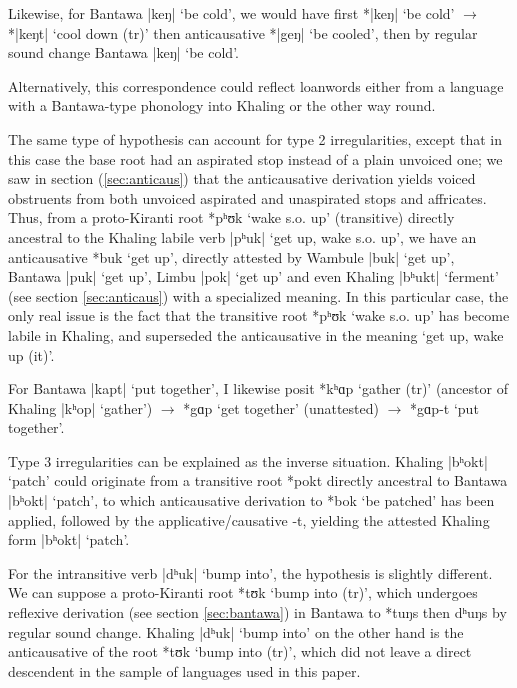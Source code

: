 \documentclass[oneside,a4paper,11pt]{article}
\newcommand{\ipa}[1]{{\phon\mbox{#1}}} %
\newcommand{\dhatu}[2]{|\ipa{#1}| `#2'}
\begin{document}
Likewise, for Bantawa \dhatu{keŋ}{be cold}, we would have first *\dhatu{keŋ}{be cold} $\rightarrow$ *\dhatu{keŋt}{cool down (tr)} then anticausative *\dhatu{geŋ}{be cooled}, then by regular sound change Bantawa \dhatu{keŋ}{be cold}.
 
 Alternatively, this correspondence could reflect loanwords either from a language with a Bantawa-type phonology into Khaling or the other way round.
 
The same type of hypothesis can account for type 2 irregularities, except that in this case the base root  had an aspirated stop instead of a plain unvoiced one; we saw in section  (\ref{sec:anticaus}) that the anticausative derivation yields voiced obstruents from both unvoiced aspirated and unaspirated stops and affricates. Thus, from a proto-Kiranti root \ipa{*pʰʊk} `wake s.o. up' (transitive) directly ancestral to the Khaling labile verb \dhatu{pʰuk}{get up, wake s.o. up}, we have an anticausative \ipa{*buk} `get up', directly attested by Wambule \dhatu{buk}{get up}, Bantawa \dhatu{puk}{get up}, Limbu \dhatu{pok}{get up} and even Khaling \dhatu{bʰukt}{ferment} (see section \ref{sec:anticaus}) with a specialized meaning. In this particular case, the only real issue is the fact that the transitive root \ipa{*pʰʊk} `wake s.o. up' has become labile in Khaling, and superseded the anticausative in the meaning `get up, wake up (it)'.

For Bantawa  \dhatu{kapt}{put together}, I likewise posit *\ipa{kʰɑp} `gather (tr)' (ancestor of Khaling \dhatu{kʰop}{gather}) $\rightarrow$  *\ipa{gɑp} `get together' (unattested) $\rightarrow$  *\ipa{gɑp-t} `put together'.
 
Type 3  irregularities can be explained as the inverse situation. Khaling \dhatu{bʰokt}{patch} could originate from a transitive root *\ipa{pokt} directly ancestral to Bantawa \dhatu{bʰokt}{patch}, to which anticausative derivation to *\ipa{bok} `be patched' has been applied, followed by the applicative/causative \ipa{-t}, yielding the attested Khaling form \dhatu{bʰokt}{patch}. 

For the intransitive verb \dhatu{dʰuk}{bump into}, the hypothesis is slightly different. We can suppose a proto-Kiranti root *\ipa{tʊk} `bump into (tr)', which undergoes reflexive derivation (see section \ref{sec:bantawa}) in Bantawa to *\ipa{tuŋs} then \ipa{dʰuŋs} by regular sound change. Khaling \dhatu{dʰuk}{bump into} on the other hand is the anticausative of the root *\ipa{tʊk} `bump into (tr)', which did not leave a direct descendent in the sample of languages used in this paper.
 
\end{document}
